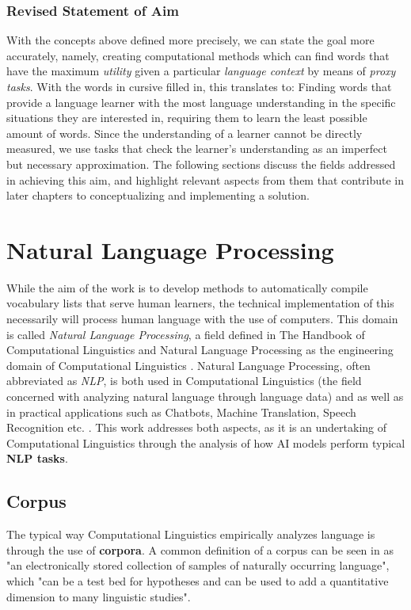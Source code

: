 \subsubsection{Revised Statement of Aim}
With the concepts above defined more precisely, we can state the goal more accurately, namely, creating computational methods which can find words that have the maximum \textit{utility} given a particular \textit{language context} by means of \textit{proxy tasks}.
With the words in cursive filled in, this translates to:
Finding words that provide a language learner with the most language understanding in the specific situations they are interested in, requiring them to learn the least possible amount of words.
Since the understanding of a learner cannot be directly measured, we use tasks that check the learner's understanding as an imperfect but necessary approximation.
The following sections discuss the fields addressed in achieving this aim, and highlight relevant aspects from them that contribute in later chapters to conceptualizing and implementing a solution.


\section{Natural Language Processing} \label{sec:natural-language-processing}
While the aim of the work is to develop methods to automatically compile vocabulary lists that serve human learners, the technical implementation of this necessarily will process human language with the use of computers.
This domain is called \textit{Natural Language Processing}, a field defined in The Handbook of Computational Linguistics and Natural Language Processing as the engineering domain of Computational Linguistics \cite{alexanderclarkHandbookComputationalLinguistics2010}.
Natural Language Processing, often abbreviated as \textit{NLP}, is both used in Computational Linguistics (the field concerned with analyzing natural language through language data) and as well as in practical applications such as Chatbots, Machine Translation, Speech Recognition etc. \cite{jurafskySpeechLanguageProcessing2025}.
This work addresses both aspects, as it is an undertaking of Computational Linguistics through the analysis of how AI models perform typical \textbf{NLP tasks}.

\subsection{Corpus}
The typical way Computational Linguistics empirically analyzes language is through the use of \textbf{corpora}.
A common definition of a corpus can be seen in \cite{hunstonCorpusLinguistics2006a} as "an electronically stored collection of samples of naturally occurring language", which "can be a test bed for hypotheses and can be used to add a quantitative dimension to many linguistic studies".

